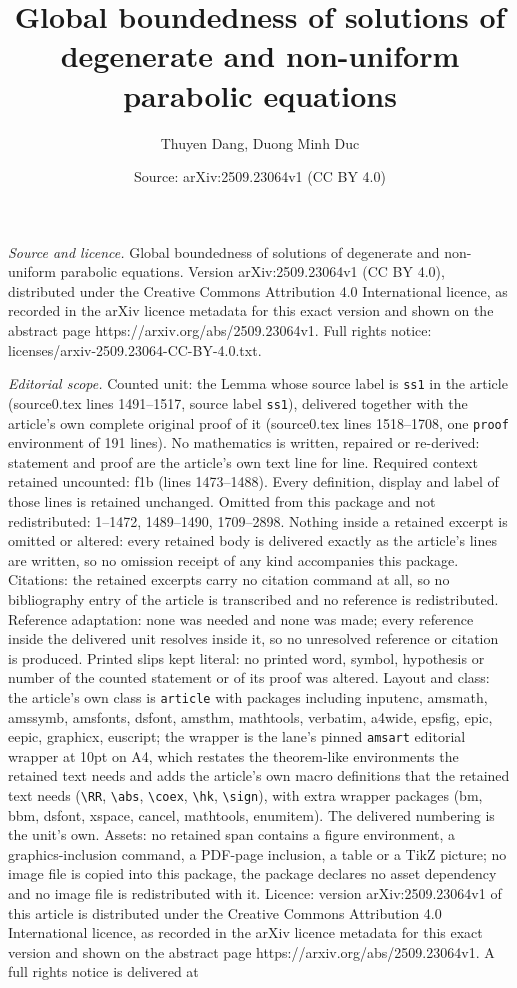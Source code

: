 \documentclass[10pt,a4paper]{amsart}
\title[Global boundedness of solutions of degenerate and non-unifor]{Global boundedness of solutions of degenerate and non-uniform parabolic equations}
\author{Thuyen Dang, Duong Minh Duc}
\date{Source: arXiv:2509.23064v1 (CC BY 4.0)}
\begin{document}
\maketitle

\noindent\emph{Source and licence.} Global boundedness of solutions of degenerate and non-uniform parabolic equations. Version arXiv:2509.23064v1 (CC BY 4.0), distributed under the Creative Commons Attribution 4.0 International licence, as recorded in the arXiv licence metadata for this exact version and shown on the abstract page https://arxiv.org/abs/2509.23064v1. Full rights notice: licenses/arxiv-2509.23064-CC-BY-4.0.txt.\par\smallskip

\noindent\textit{Editorial scope.} Counted unit: the Lemma whose source label is \texttt{ss1} in the article (source0.tex lines 1491--1517, source label \texttt{ss1}), delivered together with the article's own complete original proof of it (source0.tex lines 1518--1708, one \texttt{proof} environment of 191 lines). No mathematics is written, repaired or re-derived: statement and proof are the article's own text line for line. Required context retained uncounted: f1b (lines 1473--1488). Every definition, display and label of those lines is retained unchanged. Omitted from this package and not redistributed: 1--1472, 1489--1490, 1709--2898. Nothing inside a retained excerpt is omitted or altered: every retained body is delivered exactly as the article's lines are written, so no omission receipt of any kind accompanies this package. Citations: the retained excerpts carry no citation command at all, so no bibliography entry of the article is transcribed and no reference is redistributed. Reference adaptation: none was needed and none was made; every reference inside the delivered unit resolves inside it, so no unresolved reference or citation is produced. Printed slips kept literal: no printed word, symbol, hypothesis or number of the counted statement or of its proof was altered. Layout and class: the article's own class is \texttt{article} with packages including inputenc, amsmath, amssymb, amsfonts, dsfont, amsthm, mathtools, verbatim, a4wide, epsfig, epic, eepic, graphicx, euscript; the wrapper is the lane's pinned \texttt{amsart} editorial wrapper at 10pt on A4, which restates the theorem-like environments the retained text needs and adds the article's own macro definitions that the retained text needs (\texttt{\textbackslash RR}, \texttt{\textbackslash abs}, \texttt{\textbackslash coex}, \texttt{\textbackslash hk}, \texttt{\textbackslash sign}), with extra wrapper packages (bm, bbm, dsfont, xspace, cancel, mathtools, enumitem). The delivered numbering is the unit's own. Assets: no retained span contains a figure environment, a graphics-inclusion command, a PDF-page inclusion, a table or a TikZ picture; no image file is copied into this package, the package declares no asset dependency and no image file is redistributed with it. Licence: version arXiv:2509.23064v1 of this article is distributed under the Creative Commons Attribution 4.0 International licence, as recorded in the arXiv licence metadata for this exact version and shown on the abstract page https://arxiv.org/abs/2509.23064v1. A full rights notice is delivered at 
\end{document}
